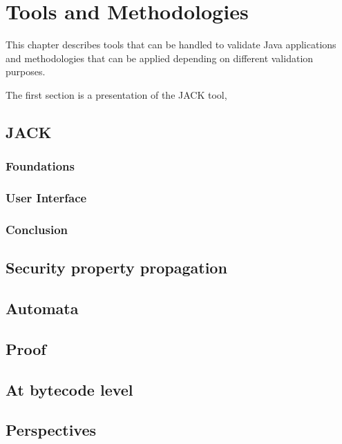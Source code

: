 \chapter{Tools and Methodologies}
This chapter describes tools that can be handled to validate Java applications and methodologies that can be applied depending on different validation purposes.

The first section is a presentation of the JACK tool,
\section{JACK}

\subsection{Foundations}

\subsection{User Interface}

%
\subsection{Conclusion}


\section{Security property propagation}




%


\section{Automata}


\section{Proof}

\section{At bytecode level}








\section{Perspectives}


